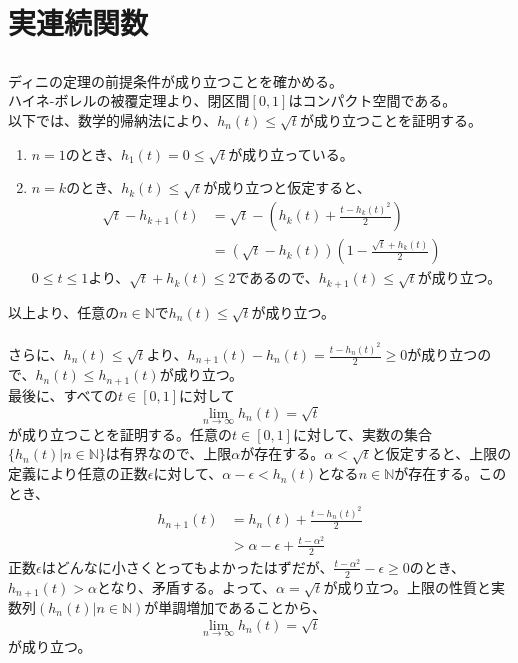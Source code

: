 \documentclass{jsarticle}
\begin{document}
\section{実連続関数}


\subsection{}
ディニの定理の前提条件が成り立つことを確かめる。\\
ハイネ-ボレルの被覆定理より、閉区間$[0,1]$はコンパクト空間である。\\
以下では、数学的帰納法により、$h_n(t)\leq\sqrt{t}$が成り立つことを証明する。
\begin{enumerate}
\item $n=1$のとき、$h_1(t)=0\leq\sqrt{t}$が成り立っている。
\item $n=k$のとき、$h_k(t)\leq\sqrt{t}$が成り立つと仮定すると、
\begin{align*}
\sqrt{t}-h_{k+1}(t)&=\sqrt{t}-(h_k(t)+\frac{t-{h_k(t)}^2}{2})\\
&=(\sqrt{t}-h_k(t))(1-\frac{\sqrt{t}+h_k(t)}{2})
\end{align*}
$0\leq t\leq1$より、$\sqrt{t}+h_k(t)\leq2$であるので、$h_{k+1}(t)\leq\sqrt{t}$が成り立つ。
\end{enumerate}
以上より、任意の$n\in\mathbb{N}$で$h_{n}(t)\leq\sqrt{t}$が成り立つ。\\
\\
さらに、$h_{n}(t)\leq\sqrt{t}$より、$h_{n+1}(t)-h_n(t)=\frac{t-{h_n(t)}^2}{2}\geq0$が成り立つので、$h_n(t)\leq h_{n+1}(t)$が成り立つ。\\

最後に、すべての$t\in[0,1]$に対して
\[\lim_{n\to\infty}h_n(t)=\sqrt{t}\]
が成り立つことを証明する。任意の$t\in[0,1]$に対して、実数の集合$\{h_n(t)|n\in\mathbb{N}\}$は有界なので、上限$\alpha$が存在する。$\alpha<\sqrt{t}$と仮定すると、上限の定義により任意の正数$\epsilon$に対して、$\alpha-\epsilon<h_n(t)$となる$n\in\mathbb{N}$が存在する。このとき、
\begin{align*}
h_{n+1}(t)&=h_n(t)+\frac{t-{h_n(t)}^2}{2}\\
&> \alpha-\epsilon+\frac{t-\alpha^2}{2}
\end{align*}
正数$\epsilon$はどんなに小さくとってもよかったはずだが、$\frac{t-\alpha^2}{2}-\epsilon\geq0$のとき、$h_{n+1}(t)>\alpha$となり、矛盾する。よって、$\alpha=\sqrt{t}$が成り立つ。上限の性質と実数列$(h_n(t)|n\in\mathbb{N})$が単調増加であることから、
\[\lim_{n\to\infty}h_n(t)=\sqrt{t}\]
が成り立つ。
\end{document}
